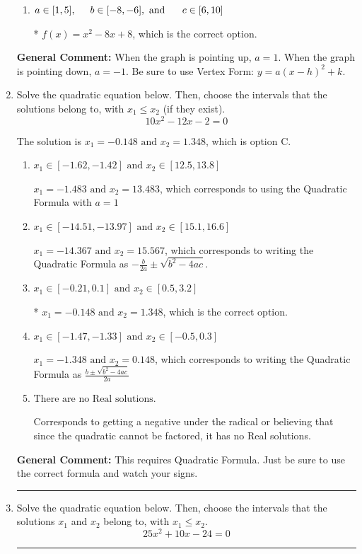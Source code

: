 \documentclass{extbook}[14pt]
\newcommand{\litem}[1]{\item #1

\rule{\textwidth}{0.4pt}}
\begin{document}
\begin{enumerate}
{\begin{enumerate}[label=\Alph*.]
$f(x)=-x^{2} -8 x -24$, which corresponds to incorrectly using vertex form as $f(x) = a(x+h)^2+k$ AND making $a$ the opposite sign than it should be.
\item \( a \in [1, 5], \hspace*{5mm} b \in [-8, -6], \text{ and } \hspace*{5mm} c \in [6, 10] \)

* $f(x)=x^{2} -8 x + 8$, which is the correct option.
\end{enumerate}

\textbf{General Comment:} When the graph is pointing up, $a=1$. When the graph is pointing down, $a=-1$. Be sure to use Vertex Form: $y = a(x-h)^2+k$.
}
\litem{
Solve the quadratic equation below. Then, choose the intervals that the solutions belong to, with $x_1 \leq x_2$ (if they exist).
\[ 10x^{2} -12 x -2 = 0 \]

The solution is \( x_1 = -0.148 \text{ and } x_2 = 1.348 \), which is option C.\begin{enumerate}[label=\Alph*.]
\item \( x_1 \in [-1.62, -1.42] \text{ and } x_2 \in [12.5, 13.8] \)

 $x_1 = -1.483 \text{ and } x_2 = 13.483$, which corresponds to using the Quadratic Formula with $a=1$
\item \( x_1 \in [-14.51, -13.97] \text{ and } x_2 \in [15.1, 16.6] \)

 $x_1 = -14.367 \text{ and } x_2 = 15.567$, which corresponds to writing the Quadratic Formula as $-\frac{b}{2a} \pm \sqrt{b^2 - 4ac}$.
\item \( x_1 \in [-0.21, 0.1] \text{ and } x_2 \in [0.5, 3.2] \)

* $x_1 = -0.148 \text{ and } x_2 = 1.348$, which is the correct option.
\item \( x_1 \in [-1.47, -1.33] \text{ and } x_2 \in [-0.5, 0.3] \)

 $x_1 = -1.348 \text{ and } x_2 = 0.148$, which corresponds to writing the Quadratic Formula as $\frac{b \pm \sqrt{b^2 - 4ac}}{2a}$
\item \( \text{There are no Real solutions.} \)

Corresponds to getting a negative under the radical or believing that since the quadratic cannot be factored, it has no Real solutions.
\end{enumerate}

\textbf{General Comment:} This requires Quadratic Formula. Just be sure to use the correct formula and watch your signs.
}
\litem{
Solve the quadratic equation below. Then, choose the intervals that the solutions $x_1$ and $x_2$ belong to, with $x_1 \leq x_2$.
\[ 25x^{2} +10 x -24 = 0 \]

}
\end{enumerate}
\end{document}
